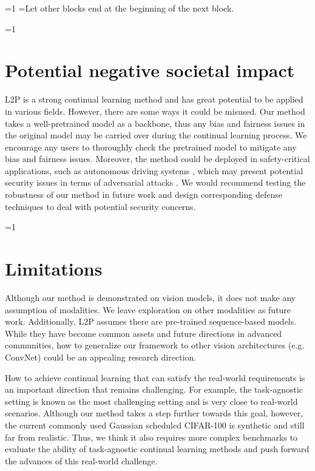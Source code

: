 \documentclass[10pt,twocolumn,letterpaper]{article}
\newcommand{\methodabbr}{L2P\xspace}
\newcounter{alphasect}
\def\alphainsection{0}
\let\oldsection=\section
\def\section{%
  \ifnum\alphainsection=1%
    \addtocounter{alphasect}{1}
  \fi%
\oldsection}%
\newenvironment{alphasection}{%
  \ifnum\alphainsection=1%
    \errhelp={Let other blocks end at the beginning of the next block.}
    \errmessage{Nested Alpha section not allowed}
  \fi%
  \setcounter{alphasect}{0}
  \def\alphainsection{1}
}{%
  \setcounter{alphasect}{0}
  \def\alphainsection{0}
}%
\begin{document}
\newpage
\onecolumn
\begin{alphasection}
\section{Potential negative societal impact}
\methodabbr is a strong continual learning method and has great potential to be applied in various fields.  
However, there are some ways it could be misused.
Our method takes a well-pretrained model as a backbone, thus any bias and fairness issues \cite{mehrabi2021survey} in the original model may be carried over during the continual learning process. 
We encourage any users to thoroughly check the pretrained model to mitigate any bias and fairness issues. 
Moreover, the method could be deployed in safety-critical applications, such as autonomous driving systems \cite{grigorescu2020survey}, which may present potential security issues in terms of adversarial attacks \cite{madry2017towards}. 
We would recommend testing the robustness of our method in future work and design corresponding defense techniques to deal with potential security concerns.

\section{Limitations}
Although our method is demonstrated on vision models, it does not make any assumption of modalities. 
We leave exploration on other modalities as future work. Additionally, \methodabbr assumes there are pre-trained sequence-based models.  While they have become common assets and future directions in advanced communities, how to generalize our framework to other vision architectures (e.g. ConvNet) could be an appealing research direction.

How to achieve continual learning that can satisfy the real-world requirements is an important direction that remains challenging. For example, the task-agnostic setting is known as the most challenging setting and is very close to real-world scenarios. Although our method takes a step further towards this goal, however, the current 
commonly used Gaussian scheduled CIFAR-100 is synthetic and still far from realistic. Thus, we think it also requires more complex benchmarks to evaluate the ability of task-agnostic continual learning methods and push forward the advances of this real-world challenge.

















\end{alphasection}
\end{document}
